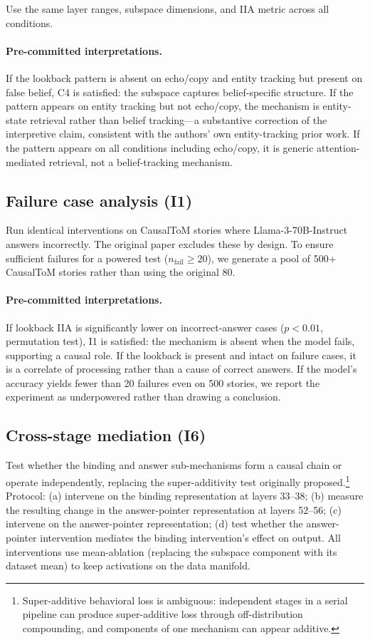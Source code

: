 \documentclass[11pt]{article}
\begin{document}
Use the same layer ranges, subspace dimensions, and IIA metric across all conditions.

\paragraph{Pre-committed interpretations.} If the lookback pattern is absent on echo/copy and entity tracking but present on false belief, C4 is satisfied: the subspace captures belief-specific structure. If the pattern appears on entity tracking but not echo/copy, the mechanism is entity-state retrieval rather than belief tracking---a substantive correction of the interpretive claim, consistent with the authors' own entity-tracking prior work. If the pattern appears on all conditions including echo/copy, it is generic attention-mediated retrieval, not a belief-tracking mechanism.

\subsection{Failure case analysis (I1)}
\label{sec:failure}

Run identical interventions on CausalToM stories where Llama-3-70B-Instruct answers incorrectly. The original paper excludes these by design. To ensure sufficient failures for a powered test ($n_{\text{fail}} \geq 20$), we generate a pool of 500+ CausalToM stories rather than using the original 80.

\paragraph{Pre-committed interpretations.} If lookback IIA is significantly lower on incorrect-answer cases ($p < 0.01$, permutation test), I1 is satisfied: the mechanism is absent when the model fails, supporting a causal role. If the lookback is present and intact on failure cases, it is a correlate of processing rather than a cause of correct answers. If the model's accuracy yields fewer than 20 failures even on 500 stories, we report the experiment as underpowered rather than drawing a conclusion.

\subsection{Cross-stage mediation (I6)}
\label{sec:mediation}

Test whether the binding and answer sub-mechanisms form a causal chain or operate independently, replacing the super-additivity test originally proposed.\footnote{Super-additive behavioral loss is ambiguous: independent stages in a serial pipeline can produce super-additive loss through off-distribution compounding, and components of one mechanism can appear additive.} Protocol: (a) intervene on the binding representation at layers 33--38; (b) measure the resulting change in the answer-pointer representation at layers 52--56; (c) intervene on the answer-pointer representation; (d) test whether the answer-pointer intervention mediates the binding intervention's effect on output. All interventions use mean-ablation (replacing the subspace component with its dataset mean) to keep activations on the data manifold.
\end{document}
